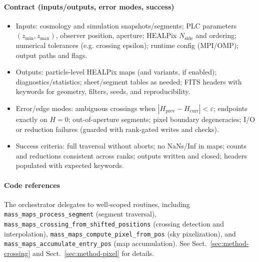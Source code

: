 \documentclass{aa}
\begin{document}
   \paragraph{Contract (inputs/outputs, error modes, success)}\label{para:orchestrator-contract}
   \begin{itemize}
   \item Inputs: cosmology and simulation snapshots/segments; PLC parameters $(z_{\mathrm{min}}, z_{\mathrm{max}})$, observer position, aperture; HEALPix $N_{\mathrm{side}}$ and ordering; numerical tolerances (e.g. crossing epsilon); runtime config (MPI/OMP); output paths and flags.
      \item Outputs: particle-level HEALPix maps (and variants, if enabled); diagnostics/statistics; sheet/segment tables as needed; FITS headers with keywords for geometry, filters, seeds, and reproducibility.
      \item Error/edge modes: ambiguous crossings when $|H_\mathrm{prev}-H_\mathrm{curr}| < \varepsilon$; endpoints exactly on $H=0$; out-of-aperture segments; pixel boundary degeneracies; I/O or reduction failures (guarded with rank-gated writes and checks).
      \item Success criteria: full traversal without aborts; no NaNs/Inf in maps; counts and reductions consistent across ranks; outputs written and closed; headers populated with expected keywords.
   \end{itemize}

   \paragraph{Code references} The orchestrator delegates to well-scoped routines, including \texttt{mass\_maps\_process\_segment} (segment traversal), \texttt{mass\_maps\_crossing\_from\_shifted\_positions} (crossing detection and interpolation), \texttt{mass\_maps\_compute\_pixel\_from\_pos} (sky pixelization), and \texttt{mass\_maps\_accumulate\_entry\_pos} (map accumulation). See Sect.~\ref{sec:method-crossing} and Sect.~\ref{sec:method-pixel} for details.
\end{document}
